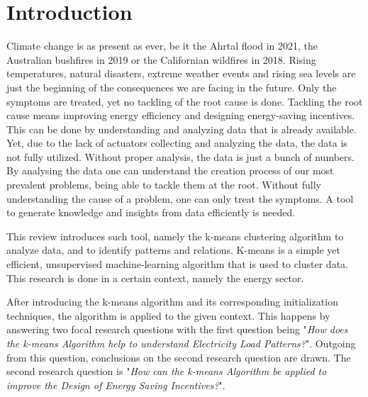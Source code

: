 \chapter{Introduction}
\label{cha:introduction}


Climate change is as present as ever, be it the Ahrtal flood in 2021, the Australian bushfires in 2019 or the Californian wildfires in 2018.
Rising temperatures, natural disasters, extreme weather events and rising sea levels are just the beginning of the consequences we are facing in the future.
Only the symptoms are treated, yet no tackling of the root cause is done.
Tackling the root cause means improving energy efficiency and designing energy-saving incentives.\\
This can be done by understanding and analyzing data that is already available.
Yet, due to the lack of actuators collecting and analyzing the data, the data is not fully utilized.
Without proper analysis, the data is just a bunch of numbers.
By analysing the data one can understand the creation process of our most prevalent problems, being able to tackle them at the root.
Without fully understanding the cause of a problem, one can only treat the symptoms.
A tool to generate knowledge and insights from data efficiently is needed.

This review introduces such tool, namely the k-means clustering algorithm to analyze data, and to identify patterns and relations.
K-means is a simple yet efficient, unsupervised machine-learning algorithm that is used to cluster data.
This research is done in a certain context, namely the energy sector.

After introducing the k-means algorithm and its corresponding initialization techniques, the algorithm is applied to the given context.
This happens by answering two focal research questions with the first question being "\textit{How does the k-means Algorithm help to understand Electricity Load Patterns?}".
Outgoing from this question, conclusions on the second research question are drawn.
The second research question is "\textit{How can the k-means Algorithm be applied to improve the Design of Energy Saving Incentives?}".

